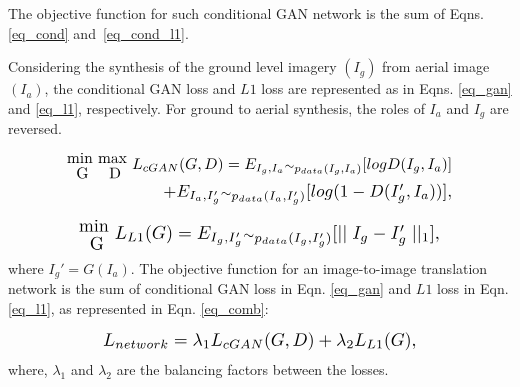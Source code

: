 \documentclass[times,twocolumn,final,authoryear]{elsarticle_modified}
\begin{document}
The objective function for such conditional GAN network is the sum of Eqns. \eqref{eq_cond} and~\eqref{eq_cond_l1}.

Considering the synthesis of the ground level imagery $(I_{g})$ from aerial image $(I_{a})$, the conditional GAN loss and $L1$ loss are represented as in Eqns. \eqref{eq_gan} and \eqref{eq_l1}, respectively. For ground to aerial synthesis, the roles of $I_a$ and $I_g$ are reversed.
\vspace{-15pt}

\begin{equation}\label{eq_gan}
\begin{split}
\resizebox{0.8\hsize}{!}{$\stackanchor{min }{G} \stackanchor{max  }{D} L_{cGAN}(G,D) = E_{I_{g},I_{a}} {\raise.01ex\hbox{$\scriptstyle\sim$}}_{p_{data}(I_{g},I_{a})} [log D(I_{g},I_{a})]
$}\\ \hspace*{0.5in}
\resizebox{0.6\hsize}{!}{$+ E_{I_a, I_g'} {\raise.01ex\hbox{$\scriptstyle\sim$}}_{p_{data}(I_{a}, I_g')}[ log(1 - D(I_g',I_{a}))],
$}\end{split}
\end{equation} 

\vspace{-10pt}


\begin{equation}\label{eq_l1}
\begin{split}
\resizebox{0.75\hsize}{!}{$\stackanchor{min  }{G} L_{L1}(G)=E_{I_g,I_g'} {\raise.01ex\hbox{$\scriptstyle\sim$}}_{p_{data}(I_g,I_g')}[\mid \mid I_g - I_g' \mid \mid _1],
$}\end{split}
\end{equation}
where $I_g' = G(I_{a})$.
The objective function for an image-to-image translation network is the sum of conditional GAN loss in Eqn. \eqref{eq_gan} and $L1$ loss in Eqn. \eqref{eq_l1}, as represented in Eqn. \eqref{eq_comb}: 

\vspace{-15pt}

\begin{equation}\label{eq_comb}
\begin{split}
\resizebox{0.65\hsize}{!}{$L_{network} = \lambda_1 L_{cGAN} (G,D) + \lambda_2 L_{L1}(G),
$}\end{split}
\end{equation}
where, $\lambda_1$ and $\lambda_2$ are the balancing factors between the losses. 
\end{document}
